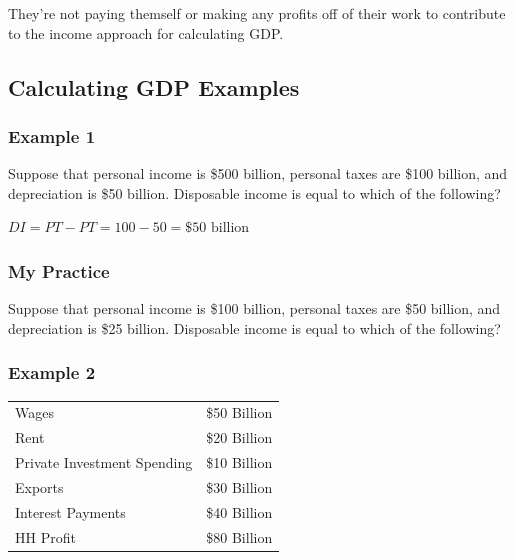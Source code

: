 \documentclass[
  letterpaper,
  DIV=11,
  numbers=noendperiod]{scrartcl}
\begin{document}
They're not paying themself or making any profits off of their work to
contribute to the income approach for calculating GDP.

\hypertarget{calculating-gdp-examples}{%
\subsection{Calculating GDP Examples}\label{calculating-gdp-examples}}

\hypertarget{example-1}{%
\subsubsection{Example 1}\label{example-1}}

Suppose that personal income is \$500 billion, personal taxes are \$100
billion, and depreciation is \$50 billion. Disposable income is equal to
which of the following?

\(DI = PT - PT = 100 - 50 = \$50 \text{ billion}\)

\hypertarget{my-practice}{%
\subsubsection{My Practice}\label{my-practice}}

Suppose that personal income is \$100 billion, personal taxes are \$50
billion, and depreciation is \$25 billion. Disposable income is equal to
which of the following?

\hypertarget{example-2}{%
\subsubsection{Example 2}\label{example-2}}

\begin{longtable}[]{@{}
  >{\raggedright\arraybackslash}p{}
  >{\raggedright\arraybackslash}p{}@{}}
\toprule\noalign{}
\endhead
\bottomrule\noalign{}
\endlastfoot
Wages & \$50 Billion \\
Rent & \$20 Billion \\
Private Investment Spending & \$10 Billion \\
Exports & \$30 Billion \\
Interest Payments & \$40 Billion \\
HH Profit & \$80 Billion \\
\end{longtable}
\end{document}
